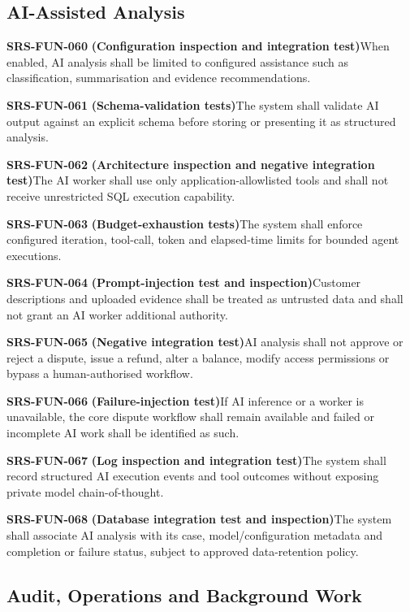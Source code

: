 \documentclass[11pt,a4paper]{article}
\newcommand{\req}[3]{%
    \par\noindent\textbf{\color{ADGBlue}#1}\quad
    \textbf{(#3)}\enspace #2\par\smallskip
}
\begin{document}
\subsection{AI-Assisted Analysis}

\req{SRS-FUN-060}{When enabled, AI analysis shall be limited to configured assistance such as classification, summarisation and evidence recommendations.}{Configuration inspection and integration test}
\req{SRS-FUN-061}{The system shall validate AI output against an explicit schema before storing or presenting it as structured analysis.}{Schema-validation tests}
\req{SRS-FUN-062}{The AI worker shall use only application-allowlisted tools and shall not receive unrestricted SQL execution capability.}{Architecture inspection and negative integration test}
\req{SRS-FUN-063}{The system shall enforce configured iteration, tool-call, token and elapsed-time limits for bounded agent executions.}{Budget-exhaustion tests}
\req{SRS-FUN-064}{Customer descriptions and uploaded evidence shall be treated as untrusted data and shall not grant an AI worker additional authority.}{Prompt-injection test and inspection}
\req{SRS-FUN-065}{AI analysis shall not approve or reject a dispute, issue a refund, alter a balance, modify access permissions or bypass a human-authorised workflow.}{Negative integration test}
\req{SRS-FUN-066}{If AI inference or a worker is unavailable, the core dispute workflow shall remain available and failed or incomplete AI work shall be identified as such.}{Failure-injection test}
\req{SRS-FUN-067}{The system shall record structured AI execution events and tool outcomes without exposing private model chain-of-thought.}{Log inspection and integration test}
\req{SRS-FUN-068}{The system shall associate AI analysis with its case, model/configuration metadata and completion or failure status, subject to approved data-retention policy.}{Database integration test and inspection}

\subsection{Audit, Operations and Background Work}
\end{document}
